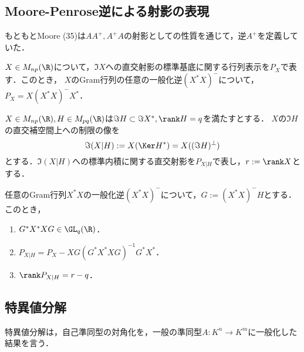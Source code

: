 \documentclass[uplatex, dvipdfmx]{jsreport}
\begin{document}
\subsection{Moore-Penrose逆による射影の表現}

\begin{tcolorbox}[colframe=ForestGreen, colback=ForestGreen!10!white,breakable,colbacktitle=ForestGreen!40!white,coltitle=black,fonttitle=\bfseries\sffamily,
title=]
    もともとMoore (35)は$AA^+,A^+A$の射影としての性質を通じて，逆$A^+$を定義していた．
\end{tcolorbox}

\begin{theorem}[直交射影の一般化逆行列による表示]
    $X\in M_{np}(\R)$について，$\Im X$への直交射影の標準基底に関する行列表示を$P_X$で表す．このとき，
    $X$のGram行列の任意の一般化逆$(X^*X)^-$について，
    $P_X=X(X^*X)^-X^*$．
\end{theorem}

\begin{notation}
    $X\in M_{np}(\R),H\in M_{pq}(\R)$は$\Im H\subset\Im X^*,\rank H=q$を満たすとする．
    $X$の$\Im H$の直交補空間上への制限の像を
    \[\Im(X|H):=X(\Ker H^*)=X((\Im H)^\perp)\]
    とする．$\Im(X|H)$への標準内積に関する直交射影を$P_{X|H}$で表し，$r:=\rank X$とする．
\end{notation}

\begin{theorem}[直交射影の制限の一般化逆行列による表示]
    任意のGram行列$X^*X$の一般化逆$(X^*X)^-$について，$G:=(X^*X)^-H$とする．
    このとき，
    \begin{enumerate}
        \item $G^*X^*XG\in \GL_q(\R)$．
        \item $P_{X|H}=P_X-XG(G^*X^*XG)^{-1}G^*X^*$．
        \item $\rank P_{X|H}=r-q$．
    \end{enumerate}
\end{theorem}

\subsection{特異値分解}

\begin{tcolorbox}[colframe=ForestGreen, colback=ForestGreen!10!white,breakable,colbacktitle=ForestGreen!40!white,coltitle=black,fonttitle=\bfseries\sffamily,
title=]
    特異値分解は，自己準同型の対角化を，一般の準同型$A:K^n\to K^m$に一般化した結果を言う．
\end{tcolorbox}
\end{document}
